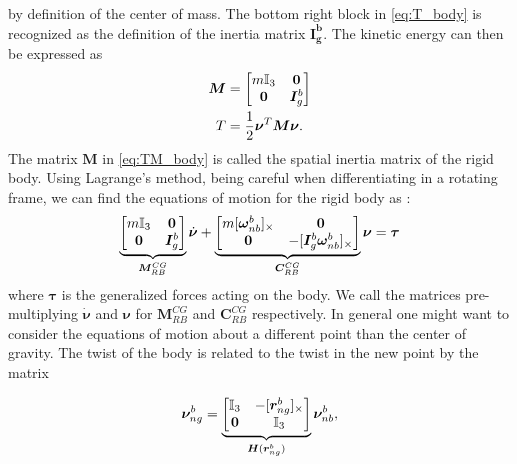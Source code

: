 by definition of the center of mass. The bottom right block in \autoref{eq:T_body} is recognized as the
definition of the inertia matrix $\bm{I_g^b}$. The kinetic energy can then be
expressed as
\begin{subequations}
\begin{align}
    \bm{M} &= \begin{bmatrix} m\mathbb{I}_{3} & \bm{0} \\ \bm{0} & \bm{I}_g^b \end{bmatrix} \\
        T &= \frac{1}{2} \bm{\nu}^T \bm{M} \bm{\nu}. \label{eq:TM_body}
\end{align}
\end{subequations}
The matrix $\bm{M}$ in \autoref{eq:TM_body} is called the spatial inertia matrix of the rigid body.
Using Lagrange's method, being careful when differentiating in a rotating frame,
we can find the equations of motion for the rigid body as \cite{fossen2021}:
\begin{align}
    \underbrace{
    \begin{bmatrix}
        m \mathbb{I}_{3} & \bm{0} \\
        \bm{0} & \bm{I}_g^b
    \end{bmatrix}
}_{\bm{M}_{RB}^{CG}} \dot{\bm{\nu}}
    +
    \underbrace{
    \begin{bmatrix}
        m [\bm{\omega}_{nb}^b]_{\times} & \bm{0} \\
        \bm{0} & -[\bm{I}_g^b \bm{\omega}_{nb}^b]_{\times}
    \end{bmatrix}
}_{\bm{C}_{RB}^{CG}}\bm{\nu} = \bm{\tau}
    \label{eq:rigid_body_eom_cg}
\end{align}
where $\bm{\tau}$ is the generalized forces acting on the body. We call the matrices
pre-multiplying $\dot{\bm{\nu}}$ and $\bm{\nu}$ for $\bm{M}_{RB}^{CG}$ and $\bm{C}_{RB}^{CG}$ respectively. In general one might want to consider the equations of motion
about a different point than the center of gravity. The twist of the body is
related to the twist in the new point by the matrix \cite{fossen2021}

\begin{align}
        \bm{\nu}_{ng}^{b} =
    \underbrace{
        \begin{bmatrix}
            \mathbb{I}_{3} & -[\bm{r}_{ng}^{b}]_{\times} \\
            \bm{0} & \mathbb{I}_{3}
        \end{bmatrix}
    }_{\bm{H}(\bm{r}_{ng}^b)}
    \bm{\nu}_{nb}^{b},
    \label{eq:fossen_H}
\end{align}

